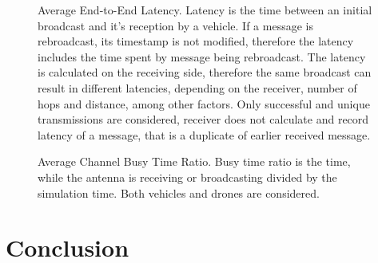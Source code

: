 \documentclass[]{nsm-thesis}
\begin{document}
\begin{figure}%
	\centering
	\hfill
	\hfill
	\caption{Average End-to-End Latency. Latency is the time between an initial broadcast and it's reception by a vehicle. If a message is rebroadcast, its timestamp is not modified, therefore the latency includes the time spent by message being rebroadcast. The latency is calculated on the receiving side, therefore the same broadcast can result in different latencies, depending on the receiver, number of hops and distance, among other factors. Only successful and unique transmissions are considered, receiver does not calculate and record latency of a message, that is a duplicate of earlier received message.}%
	\label{fig:Evaluation-Latency}%
\end{figure}




\begin{figure}%
	\centering
	\hfill
	\hfill
	\caption{Average Channel Busy Time Ratio. Busy time ratio is the time, while the antenna is receiving or broadcasting divided by the simulation time. Both vehicles and drones are considered.}%
	\label{fig:Evaluation-ChannelBusyTimeRatio}%
\end{figure}


\chapter{Conclusion}

\cleardoublepage

\listofabbreviations
\clearpage

\listoffigures
\clearpage

\listoftables
\clearpage

\printbibliography
\end{document}
